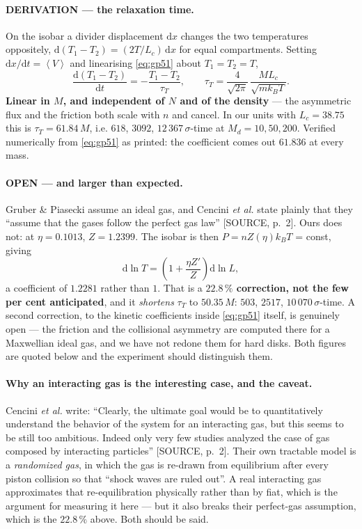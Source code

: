 \documentclass[11pt,a4paper]{article}
\newcommand{\avg}[1]{\left\langle #1 \right\rangle}
\newcommand{\dd}{\mathrm{d}}
\begin{document}
\paragraph{DERIVATION --- the relaxation time.} On the isobar a divider displacement $\dd x$ changes
the two temperatures oppositely, $\dd(T_1-T_2) = (2T/L_c)\,\dd x$ for equal compartments. Setting
$\dd x/\dd t = \avg V$ and linearising \eqref{eq:gp51} about $T_1 = T_2 = T$,
\begin{equation}
\frac{\dd(T_1-T_2)}{\dd t} = -\frac{T_1-T_2}{\tau_T},\qquad
\tau_T = \frac{4}{\sqrt{2\pi}}\,\frac{M L_c}{\sqrt{mk_BT}} .
\label{eq:tauT}
\end{equation}
\textbf{Linear in $M$, and independent of $N$ and of the density} --- the asymmetric flux and the
friction both scale with $n$ and cancel. In our units with $L_c = 38.75$ this is
$\tau_T = 61.84\,M$, i.e. $618$, $3092$, $12\,367\,\sigma$-time at $M_d = 10, 50, 200$. Verified
numerically from \eqref{eq:gp51} as printed: the coefficient comes out $61.836$ at every mass.

\paragraph{OPEN --- and larger than expected.} Gruber \& Piasecki assume an ideal gas, and Cencini
\emph{et al.} state plainly that they ``assume that the gases follow the perfect gas law''
[SOURCE, p.~2]. Ours does not: at $\eta = 0.1013$, $Z = 1.2399$. The isobar is then
$P = nZ(\eta)k_BT$ = const, giving
\begin{equation}
\dd\ln T = \left(1 + \frac{\eta Z'}{Z}\right)\dd\ln L ,
\end{equation}
a coefficient of $1.2281$ rather than $1$. That is a \textbf{$22.8\,\%$ correction, not the few per
cent anticipated}, and it \emph{shortens} $\tau_T$ to $50.35\,M$: $503$, $2517$,
$10\,070\,\sigma$-time. A second correction, to the kinetic coefficients inside \eqref{eq:gp51}
itself, is genuinely open --- the friction and the collisional asymmetry are computed there for a
Maxwellian ideal gas, and we have not redone them for hard disks. Both figures are quoted below and
the experiment should distinguish them.

\paragraph{Why an interacting gas is the interesting case, and the caveat.} Cencini \emph{et al.}
write: ``Clearly, the ultimate goal would be to quantitatively understand the behavior of the system
for an interacting gas, but this seems to be still too ambitious. Indeed only very few studies
analyzed the case of gas composed by interacting particles'' [SOURCE, p.~2]. Their own tractable
model is a \emph{randomized gas}, in which the gas is re-drawn from equilibrium after every piston
collision so that ``shock waves are ruled out''. A real interacting gas approximates that
re-equilibration physically rather than by fiat, which is the argument for measuring it here --- but
it also breaks their perfect-gas assumption, which is the $22.8\,\%$ above. Both should be said.
\end{document}
